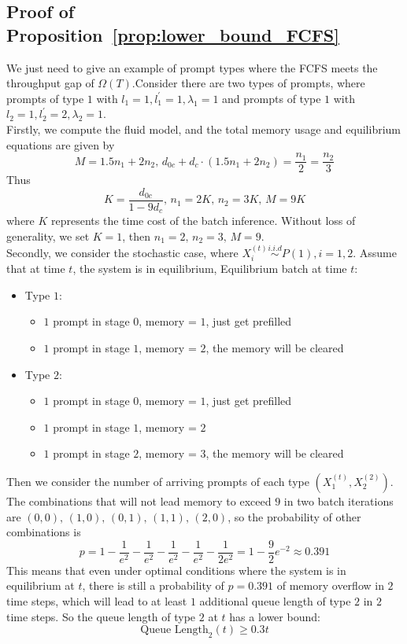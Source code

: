 \subsection{Proof of Proposition~\ref{prop:lower_bound_FCFS}}\label{appendix::proof of lower bound of of FCFS}
We just need to give an example of prompt types where the FCFS meets the throughput gap of $\Omega(T)$.Consider there are two types of prompts, where prompts of type $1$ with $l_1=1, l_1^\prime=1, \lambda_1=1$ and prompts of type $1$ with $l_2=1, l_2^\prime=2, \lambda_2=1$. \\
Firstly, we compute the fluid model, and the total memory usage and equilibrium equations are given by
$$M = 1.5n_1+2n_2,\, d_{0c}+d_c\cdot (1.5n_1+2n_2) = \frac{n_1}{2}=\frac{n_2}{3}$$
Thus
$$K = \frac{d_{0c}}{1-9d_c},\, n_1 = 2K,\, n_2=3K,\, M=9K$$
where $K$ represents the time cost of the batch inference. Without loss of generality, we set $K=1$, then $n_1=2, \,n_2=3,\,M=9 $. \\
Secondly, we consider the stochastic case, where $X_i^{(t)}\overset{i.i.d}{\sim} P(1), i=1,2$. Assume that at time $t$, the system is in equilibrium, Equilibrium batch at time $t$:
\begin{itemize}
    \item Type $1$:
    \begin{itemize}
        \itemsep0em
        \item $1$ prompt in stage $0$, memory = $1$, just get prefilled
        \item $1$ prompt in stage $1$, memory = $2$, the memory will be cleared
    \end{itemize}
    \item Type $2$:
    \begin{itemize}
        \itemsep0em
        \item $1$ prompt in stage $0$, memory = $1$, just get prefilled
        \item $1$ prompt in stage $1$, memory = $2$
        \item $1$ prompt in stage $2$, memory = $3$, the memory will be cleared
    \end{itemize}
\end{itemize}
Then we consider the number of arriving prompts of each type $(X_1^{(t)}, X_2^{(2)})$. The combinations that will not lead memory to exceed $9$ in two batch iterations are $(0,0),\,(1,0),\,(0,1),\,(1,1),\,(2,0)$, so the probability of other combinations is 
$$p = 1 - \frac{1}{e^2}- \frac{1}{e^2}- \frac{1}{e^2}- \frac{1}{e^2}- \frac{1}{2e^2}=1- \frac{9}{2}e^{-2} \approx 0.391 $$
This means that even under optimal conditions where the system is in equilibrium at $t$, there is still a probability of $p = 0.391$ of memory overflow in $2$ time steps, which will lead to at least $1$ additional queue length of type $2$ in $2$ time steps. So the queue length of type $2$ at $t$ has a lower bound:
$$\text{Queue Length}_2(t) \geq 0.3t$$


